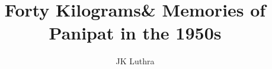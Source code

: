 \documentclass[a5paper,13pt]{memoir}
\begin{document}
\title{Forty Kilograms\linebreak\& Memories of Panipat in the 1950s}
\author{JK Luthra}
\date{}
\maketitle
\clearpage
\tableofcontents















\end{document}
